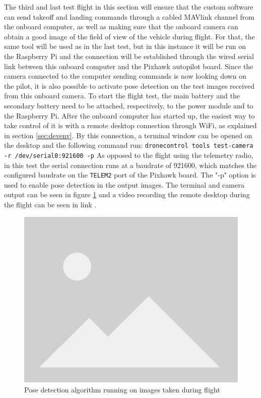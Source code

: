 The third and last test flight in this section will ensure that the custom software can send takeoff and landing commands through a cabled MAVlink channel from the onboard computer,
as well as making sure that the onboard camera can obtain a good image of the field of view of the vehicle during flight.
For that, the same tool will be used as in the last test, 
but in this instance it will be run on the Raspberry Pi and the connection will be established through the wired serial link between this onboard computer and the Pixhawk autopilot board.
Since the camera connected to the computer sending commands is now looking down on the pilot, it is also possible to activate pose detection on the test images received from this onboard camera.
To start the flight test, the main battery and the secondary battery need to be attached, respectively, to the power module and to the Raspberry Pi.
After the onboard computer has started up, the easiest way to take control of it is with a remote desktop connection through WiFi, as explained in section \ref{sec:devenv}.
By this connection, a terminal window can be opened on the desktop and the following command run:
\verb|dronecontrol tools test-camera -r /dev/serial0:921600 -p|
As opposed to the flight using the telemetry radio, in this test the serial connection runs at a baudrate of 921600, which matches the configured baudrate on the \verb|TELEM2| port of the Pixhawk board.
The "-p" option is used to enable pose detection in the output images.
The terminal and camera output can be seen in figure \ref{fig:flight-test-cam-onboard} and a video recording the remote desktop during the flight can be seen in link .


\begin{figure}
  \centering
  \includegraphics[width=.6\textwidth, keepaspectratio]{img/placeholder.png}
  \caption{Pose detection algorithm running on images taken during flight}\label{fig:flight-test-cam-onboard}
\end{figure}


